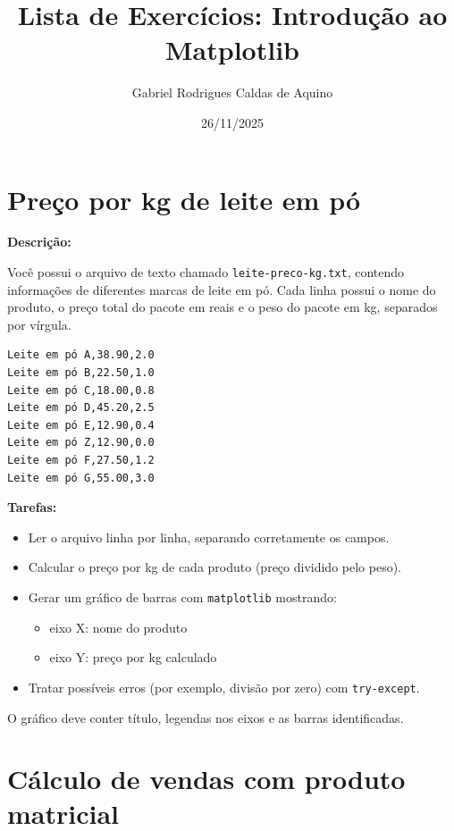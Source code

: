 \title{Lista de Exercícios: Introdução ao Matplotlib}
\author{Gabriel Rodrigues Caldas de Aquino}
\date{26/11/2025}



\maketitle

\section{Preço por kg de leite em pó}

\textbf{Descrição:}

Você possui o arquivo de texto chamado \texttt{leite-preco-kg.txt}, contendo informações de diferentes marcas de leite em pó. Cada linha possui o nome do produto, o preço total do pacote em reais e o peso do pacote em kg, separados por vírgula.

\begin{verbatim}
Leite em pó A,38.90,2.0
Leite em pó B,22.50,1.0
Leite em pó C,18.00,0.8
Leite em pó D,45.20,2.5
Leite em pó E,12.90,0.4
Leite em pó Z,12.90,0.0
Leite em pó F,27.50,1.2
Leite em pó G,55.00,3.0
\end{verbatim}

\textbf{Tarefas:}

\begin{itemize}
    \item Ler o arquivo linha por linha, separando corretamente os campos.
    \item Calcular o preço por kg de cada produto (preço dividido pelo peso).
    \item Gerar um gráfico de barras com \texttt{matplotlib} mostrando:
          \begin{itemize}
              \item eixo X: nome do produto
              \item eixo Y: preço por kg calculado
          \end{itemize}
    \item Tratar possíveis erros (por exemplo, divisão por zero) com \texttt{try-except}.
\end{itemize}

O gráfico deve conter título, legendas nos eixos e as barras identificadas.


\section{Cálculo de vendas com produto matricial}

